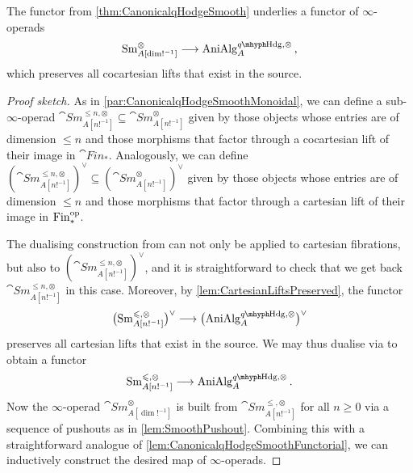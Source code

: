\documentclass[DIV=12,numbers=enddot,leqno,bibliography=totoc]{scrartcl}
\begin{document}
	
	\begin{cor}\label{cor:CanonicalqHodgeSmoothMonoidal}
		The functor from \cref{thm:CanonicalqHodgeSmooth} underlies a functor of $\infty$-operads
		\begin{equation*}
			\cat{Sm}_{A[\dim!^{-1}]}^{\otimes}\longrightarrow \cat{AniAlg}_A^{\qHodge,\otimes}\,,
		\end{equation*}		
		which preserves all cocartesian lifts that exist in the source.
	\end{cor}
	\begin{proof}[Proof sketch]
		As in \cref{par:CanonicalqHodgeSmoothMonoidal}, we can define a sub-$\infty$-operad $\cat{Sm}_{A[n!^{-1}]}^{\leqslant n,\otimes}\subseteq \cat{Sm}_{A[n!^{-1}]}^\otimes$ given by those objects whose entries are of dimension $\leqslant n$ and those morphisms that factor through a cocartesian lift of their image in $\cat{Fin}_*$. Analogously, we can define $(\cat{Sm}_{A[n!^{-1}]}^{\leqslant n,\otimes})^\vee\subseteq (\cat{Sm}_{A[n!^{-1}]}^\otimes)^\vee$ given by those objects whose entries are of dimension $\leqslant n$ and those morphisms that factor through a cartesian lift of their image in $\mathrm{Fin}_*^{\mathrm{op}}$.
		
		The dualising construction from \cite[]{DualFibration} can not only be applied to cartesian fibrations, but also to $(\cat{Sm}_{A[n!^{-1}]}^{\leqslant n,\otimes})^\vee$, and it is straightforward to check that we get back $\cat{Sm}_{A[n!^{-1}]}^{\leqslant n,\otimes}$ in this case. Moreover, by \cref{lem:CartesianLiftsPreserved}, the functor
		\begin{equation*}
			\bigl(\cat{Sm}_{A[n!^{-1}]}^{\leqslant,\otimes}\bigr)^\vee\longrightarrow \bigl(\cat{AniAlg}_A^{\qHodge,\otimes}\bigr)^\vee
		\end{equation*}
		preserves all cartesian lifts that exist in the source. We may thus dualise via \cite[]{DualFibration} to obtain a functor
		\begin{equation*}
			\cat{Sm}_{A[n!^{-1}]}^{\leqslant,\otimes}\longrightarrow \cat{AniAlg}_A^{\qHodge,\otimes}\,.
		\end{equation*}
		Now the $\infty$-operad $\cat{Sm}_{A[\dim!^{-1}]}^{\otimes}$ is built from $\cat{Sm}_{A[n!^{-1}]}^{\leqslant,\otimes}$ for all $n\geqslant 0$ via a sequence of pushouts as in \cref{lem:SmoothPushout}. Combining this with a straightforward analogue of \cref{lem:CanonicalqHodgeSmoothFunctorial}, we can inductively construct the desired map of $\infty$-operads.
	\end{proof}
	
\end{document}
